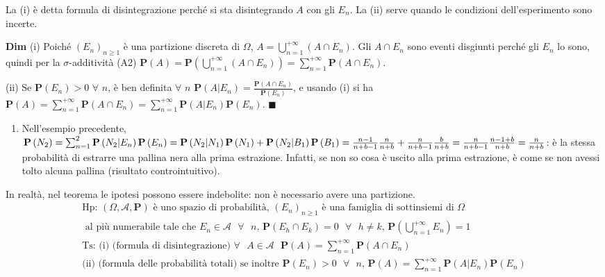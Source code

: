 \documentclass{article}
\begin{document}
La (i) \`{e} detta formula di disintegrazione perch\'{e} si sta
disintegrando $A$ con gli $E_{n}$. La (ii) serve quando le condizioni
dell'esperimento sono incerte.

\textbf{Dim} (i) Poich\'{e} $\left( E_{n}\right) _{n\geq 1}$ \`{e} una
partizione discreta di $\Omega $, $A=\bigcup_{n=1}^{+\infty }\left( A\cap
E_{n}\right) $. Gli $A\cap E_{n}$ sono eventi disgiunti perch\'{e} gli $%
E_{n} $ lo sono, quindi per la $\sigma $-additivit\`{a} (A2) $\mathbf{P}%
\left( A\right) =\mathbf{P}\left( \bigcup_{n=1}^{+\infty }\left( A\cap
E_{n}\right) \right) =\sum_{n=1}^{+\infty }\mathbf{P}\left( A\cap
E_{n}\right) $.

(ii) Se $\mathbf{P}\left( E_{n}\right) >0$ $\forall $ $n$, \`{e} ben
definita $\forall $ $n$ $\mathbf{P}\left( A|E_{n}\right) =\frac{\mathbf{P}%
\left( A\cap E_{n}\right) }{\mathbf{P}\left( E_{n}\right) }$, e usando (i)
si ha $\mathbf{P}\left( A\right) =\sum_{n=1}^{+\infty }\mathbf{P}\left(
A\cap E_{n}\right) =\sum_{n=1}^{+\infty }\mathbf{P}\left( A|E_{n}\right) 
\mathbf{P}\left( E_{n}\right) $. $\blacksquare $

\begin{enumerate}
\item Nell'esempio precedente, $\mathbf{P}\left( N_{2}\right) =\sum_{n=1}^{2}%
\mathbf{P}\left( N_{2}|E_{n}\right) \mathbf{P}\left( E_{n}\right) =\mathbf{P}%
\left( N_{2}|N_{1}\right) \mathbf{P}\left( N_{1}\right) +\mathbf{P}\left(
N_{2}|B_{1}\right) \mathbf{P}\left( B_{1}\right) =\frac{n-1}{n+b-1}\frac{n}{%
n+b}+\frac{n}{n+b-1}\frac{b}{n+b}=\frac{n}{n+b-1}\frac{n-1+b}{n+b}=\frac{n}{%
n+b}$: \`{e} la stessa probabilit\`{a} di estrarre una pallina nera alla
prima estrazione. Infatti, se non so cosa \`{e} uscito alla prima
estrazione, \`{e} come se non avessi tolto alcuna pallina (risultato
controintuitivo).
\end{enumerate}

In realt\`{a}, nel teorema le ipotesi possono essere indebolite: non \`{e}
necessario avere una partizione. 
\begin{gather*}
\text{Hp: }\left( \Omega ,\mathcal{A},\mathbf{P}\right) \text{ \`{e} uno
spazio di probabilit\`{a}, }\left( E_{n}\right) _{n\geq 1}\text{ \`{e} una
famiglia di sottinsiemi di }\Omega \text{ } \\
\text{ al pi\`{u} numerabile tale che }E_{n}\in \mathcal{A}\text{ }\forall 
\text{ }n\text{, }\mathbf{P}\left( E_{h}\cap E_{k}\right) =0\text{ }\forall 
\text{ }h\neq k\text{, }\mathbf{P}\left( \bigcup_{n=1}^{+\infty
}E_{n}\right) =1 \\
\text{Ts: (i) (formula di disintegrazione) }\forall \text{ }A\in \mathcal{A}%
\text{ }\mathbf{P}\left( A\right) =\sum_{n=1}^{+\infty }\mathbf{P}\left(
A\cap E_{n}\right) \\
\text{(ii) (formula delle probabilit\`{a} totali) se inoltre }\mathbf{P}%
\left( E_{n}\right) >0\text{ }\forall \text{ }n\text{, }\mathbf{P}\left(
A\right) =\sum_{n=1}^{+\infty }\mathbf{P}\left( A|E_{n}\right) \mathbf{P}%
\left( E_{n}\right)
\end{gather*}
\end{document}
